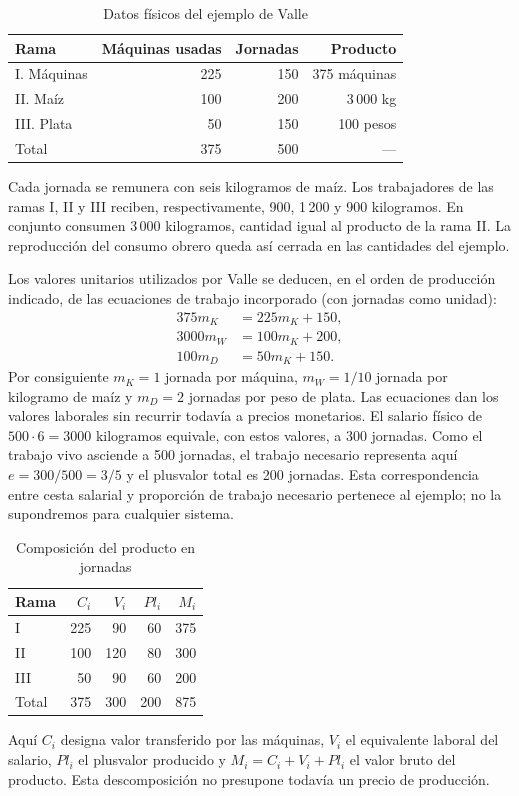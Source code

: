 \documentclass[10pt,twoside]{article}
\begin{document}
\begin{table}[htbp]\centering\footnotesize
\caption{Datos físicos del ejemplo de Valle}
\begin{tabular}{@{}lrrr@{}}\toprule
Rama & Máquinas usadas & Jornadas & Producto\\\midrule
I. Máquinas & 225 & 150 & 375 máquinas\\
II. Maíz & 100 & 200 & 3\,000 kg\\
III. Plata & 50 & 150 & 100 pesos\\\midrule
Total & 375 & 500 & ---\\\bottomrule
\end{tabular}
\end{table}
Cada jornada se remunera con seis kilogramos de maíz. Los trabajadores de las ramas I, II y III reciben, respectivamente, 900, 1\,200 y 900 kilogramos. En conjunto consumen 3\,000 kilogramos, cantidad igual al producto de la rama II. La reproducción del consumo obrero queda así cerrada en las cantidades del ejemplo.

Los valores unitarios utilizados por Valle se deducen, en el orden de producción indicado, de las ecuaciones de trabajo incorporado (con jornadas como unidad):
\[
\begin{aligned}375m_K&=225m_K+150,\\3000m_W&=100m_K+200,\\100m_D&=50m_K+150.\end{aligned}
\]
Por consiguiente $m_K=1$ jornada por máquina, $m_W=1/10$ jornada por kilogramo de maíz y $m_D=2$ jornadas por peso de plata. Las ecuaciones dan los valores laborales sin recurrir todavía a precios monetarios. El salario físico de $500\cdot6=3000$ kilogramos equivale, con estos valores, a 300 jornadas. Como el trabajo vivo asciende a 500 jornadas, el trabajo necesario representa aquí $e=300/500=3/5$ y el plusvalor total es 200 jornadas. Esta correspondencia entre cesta salarial y proporción de trabajo necesario pertenece al ejemplo; no la supondremos para cualquier sistema.

\begin{table}[htbp]\centering\footnotesize
\caption{Composición del producto en jornadas}
\begin{tabular}{@{}lrrrr@{}}\toprule
Rama & $C_i$ & $V_i$ & $Pl_i$ & $M_i$\\\midrule
I & 225 & 90 & 60 & 375\\
II & 100 & 120 & 80 & 300\\
III & 50 & 90 & 60 & 200\\\midrule
Total & 375 & 300 & 200 & 875\\\bottomrule
\end{tabular}
\end{table}
Aquí $C_i$ designa valor transferido por las máquinas, $V_i$ el equivalente laboral del salario, $Pl_i$ el plusvalor producido y $M_i=C_i+V_i+Pl_i$ el valor bruto del producto. Esta descomposición no presupone todavía un precio de producción.
\end{document}
